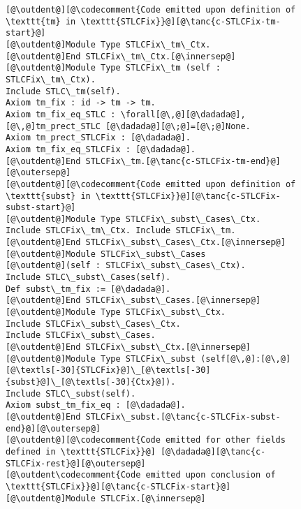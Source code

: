 \begin{figure}
\vspace{-5pt}
\begin{minipage}{\textwidth}
\begin{multicols}{2}



\newcommand{\innersep}{\vspace{6pt}}
\newcommand{\outersep}{\vspace{5pt}}
\newcommand{\outdent}{\!\!\!}


\begin{lstlisting}
[@\outdent@][@\codecomment{Code emitted upon definition of \texttt{tm} in \texttt{STLCFix}}@][@\tanc{c-STLCFix-tm-start}@]
[@\outdent@]Module Type STLCFix\_tm\_Ctx.
[@\outdent@]End STLCFix\_tm\_Ctx.[@\innersep@]
[@\outdent@]Module Type STLCFix\_tm (self : STLCFix\_tm\_Ctx).
Include STLC\_tm(self).
Axiom tm_fix : id -> tm -> tm.
Axiom tm_fix_eq_STLC : \forall[@\,@][@\dadada@],[@\,@]tm_prect_STLC [@\dadada@][@\;@]=[@\;@]None.
Axiom tm_prect_STLCFix : [@\dadada@].
Axiom tm_fix_eq_STLCFix : [@\dadada@].
[@\outdent@]End STLCFix\_tm.[@\tanc{c-STLCFix-tm-end}@][@\outersep@]
[@\outdent@][@\codecomment{Code emitted upon definition of \texttt{subst} in \texttt{STLCFix}}@][@\tanc{c-STLCFix-subst-start}@]
[@\outdent@]Module Type STLCFix\_subst\_Cases\_Ctx.
Include STLCFix\_tm\_Ctx. Include STLCFix\_tm.
[@\outdent@]End STLCFix\_subst\_Cases\_Ctx.[@\innersep@]
[@\outdent@]Module STLCFix\_subst\_Cases
[@\outdent@](self : STLCFix\_subst\_Cases\_Ctx).
Include STLC\_subst\_Cases(self).
Def subst\_tm_fix := [@\dadada@].
[@\outdent@]End STLCFix\_subst\_Cases.[@\innersep@]
[@\outdent@]Module Type STLCFix\_subst\_Ctx.
Include STLCFix\_subst\_Cases\_Ctx.
Include STLCFix\_subst\_Cases.
[@\outdent@]End STLCFix\_subst\_Ctx.[@\innersep@]
[@\outdent@]Module Type STLCFix\_subst (self[@\,@]:[@\,@][@\textls[-30]{STLCFix}@]\_[@\textls[-30]{subst}@]\_[@\textls[-30]{Ctx}@]).
Include STLC\_subst(self).
Axiom subst_tm_fix_eq : [@\dadada@].
[@\outdent@]End STLCFix\_subst.[@\tanc{c-STLCFix-subst-end}@][@\outersep@]
[@\outdent@][@\codecomment{Code emitted for other fields defined in \texttt{STLCFix}}@] [@\dadada@][@\tanc{c-STLCFix-rest}@][@\outersep@]
[@\outdent\codecomment{Code emitted upon conclusion of \texttt{STLCFix}}@][@\tanc{c-STLCFix-start}@]
[@\outdent@]Module STLCFix.[@\innersep@]

\end{lstlisting}
\end{multicols}
\end{minipage}
\end{figure}

